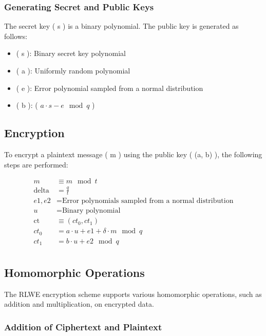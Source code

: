 \hypertarget{generating-secret-and-public-keys}{%
\subsubsection{Generating Secret and Public
Keys}\label{generating-secret-and-public-keys}}

The secret key ( s ) is a binary polynomial. The public key is generated
as follows:

\begin{itemize}
\tightlist
\item
  ( s ): Binary secret key polynomial
\item
  ( a ): Uniformly random polynomial
\item
  ( e ): Error polynomial sampled from a normal distribution
\item
  ( b ): ( \(a \cdot s - e \mod q\) )
\end{itemize}

\hypertarget{encryption}{%
\subsection{Encryption}\label{encryption}}

To encrypt a plaintext message ( m ) using the public key ( (a, b) ),
the following steps are performed:

\[
\begin{align*}
m &\equiv m \mod t \\
\text{delta} &= \frac{q}{t} \\
e1, e2 &= \text{Error polynomials sampled from a normal distribution} \\
u &= \text{Binary polynomial} \\
\text{ct} &\equiv (ct_0, ct_1) \\
ct_0 &= a \cdot u + e1 + \delta \cdot m \mod q \\
ct_1 &= b \cdot u + e2 \mod q \\
\end{align*}
\]

\hypertarget{homomorphic-operations}{%
\subsection{Homomorphic Operations}\label{homomorphic-operations}}

The RLWE encryption scheme supports various homomorphic operations, such
as addition and multiplication, on encrypted data.

\hypertarget{addition-of-ciphertext-and-plaintext}{%
\subsubsection{Addition of Ciphertext and
Plaintext}\label{addition-of-ciphertext-and-plaintext}}

